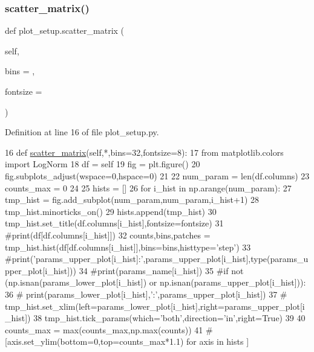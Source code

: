 \subsubsection{\texorpdfstring{scatter\+\_\+matrix()}{scatter\_matrix()}}
{\footnotesize\ttfamily def plot\+\_\+setup.\+scatter\+\_\+matrix (\begin{DoxyParamCaption}\item[{}]{self,  }\item[{}]{bins = {},  }\item[{}]{fontsize = {} }\end{DoxyParamCaption})}



Definition at line 16 of file plot\+\_\+setup.\+py.


\begin{DoxyCode}
16 \textcolor{keyword}{def }\hyperlink{namespaceplot__setup_a436a0609e4c2316379efdf45718260cb}{scatter\_matrix}(self,*,bins=32,fontsize=8):
17     \textcolor{keyword}{from} matplotlib.colors \textcolor{keyword}{import} LogNorm
18     df = self
19     fig = plt.figure()
20     fig.subplots\_adjust(wspace=0,hspace=0)
21     
22     num\_param = len(df.columns)
23     counts\_max = 0
24 
25     hists = []
26     \textcolor{keywordflow}{for} i\_hist \textcolor{keywordflow}{in} np.arange(num\_param):
27         tmp\_hist = fig.add\_subplot(num\_param,num\_param,i\_hist+1)
28         tmp\_hist.minorticks\_on()
29         hists.append(tmp\_hist)
30         tmp\_hist.set\_title(df.columns[i\_hist],fontsize=fontsize)
31         \textcolor{comment}{#print(df[df.columns[i\_hist]])}
32         counts,bins,patches = tmp\_hist.hist(df[df.columns[i\_hist]],bins=bins,histtype=\textcolor{stringliteral}{'step'})
33         \textcolor{comment}{#print('params\_upper\_plot[i\_hist]:',params\_upper\_plot[i\_hist],type(params\_upper\_plot[i\_hist]))}
34         \textcolor{comment}{#print(params\_name[i\_hist])}
35         \textcolor{comment}{#if not (np.isnan(params\_lower\_plot[i\_hist]) or np.isnan(params\_upper\_plot[i\_hist])):}
36         \textcolor{comment}{#    print(params\_lower\_plot[i\_hist],':',params\_upper\_plot[i\_hist])}
37         \textcolor{comment}{#   tmp\_hist.set\_xlim(left=params\_lower\_plot[i\_hist],right=params\_upper\_plot[i\_hist])}
38         tmp\_hist.tick\_params(which=\textcolor{stringliteral}{'both'},direction=\textcolor{stringliteral}{'in'},right=\textcolor{keyword}{True})
39     
40         counts\_max = max(counts\_max,np.max(counts))
41 \textcolor{comment}{#[axis.set\_ylim(bottom=0,top=counts\_max*1.1) for axis in hists ]}

\end{DoxyCode}
